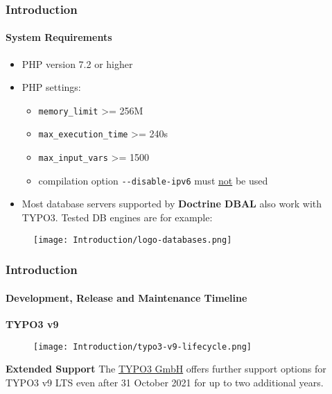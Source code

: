 \begin{frame}[fragile]
	\frametitle{Introduction}
	\framesubtitle{System Requirements}

	\begin{itemize}
		\item PHP version 7.2 or higher
		\item PHP settings:

			\begin{itemize}
				\item \texttt{memory\_limit} >= 256M
				\item \texttt{max\_execution\_time} >= 240s
				\item \texttt{max\_input\_vars} >= 1500
				\item compilation option \texttt{-}\texttt{-disable-ipv6} must \underline{not} be used
			\end{itemize}

		\item Most database servers supported by \textbf{Doctrine DBAL} also work with TYPO3.
			Tested DB engines are for example:
	\end{itemize}

	\begin{figure}
		\texttt{[image: Introduction/logo-databases.png]}
	\end{figure}

\end{frame}


\begin{frame}[fragile]
	\frametitle{Introduction}
	\framesubtitle{Development, Release and Maintenance Timeline}

	\textbf{TYPO3 v9}

	\begin{figure}
		\texttt{[image: Introduction/typo3-v9-lifecycle.png]}
	\end{figure}

	\textbf{Extended Support}\newline
	\smaller
		The \href{https://typo3.com}{TYPO3 GmbH} offers further support options
		for TYPO3 v9 LTS even after 31 October 2021 for up to two additional
		years.
	\normalsize


\end{frame}

